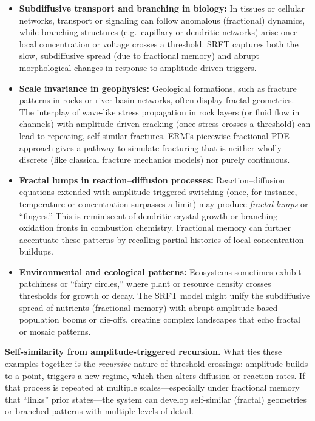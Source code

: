 \documentclass[12pt]{article}
\begin{document}
\begin{itemize}
    \item \textbf{Subdiffusive transport and branching in biology:}
    In tissues or cellular networks, transport or signaling can follow
    anomalous (fractional) dynamics, while branching structures (e.g.\ capillary
    or dendritic networks) arise once local concentration or voltage crosses
    a threshold. SRFT captures both the slow, subdiffusive spread (due to
    fractional memory) and abrupt morphological changes in response to 
    amplitude-driven triggers.

    \item \textbf{Scale invariance in geophysics:}
    Geological formations, such as fracture patterns in rocks or river basin
    networks, often display fractal geometries. The interplay of wave-like
    stress propagation in rock layers (or fluid flow in channels) with
    amplitude-driven cracking (once stress crosses a threshold) can lead to
    repeating, self-similar fractures. ERM’s piecewise fractional PDE approach
    gives a pathway to simulate fracturing that is neither wholly discrete
    (like classical fracture mechanics models) nor purely continuous.

    \item \textbf{Fractal lumps in reaction–diffusion processes:}
    Reaction–diffusion equations extended with amplitude-triggered switching
    (once, for instance, temperature or concentration surpasses a limit)
    may produce \emph{fractal lumps} or “fingers.” This is reminiscent of 
    dendritic crystal growth or branching oxidation fronts in combustion
    chemistry. Fractional memory can further accentuate these patterns by
    recalling partial histories of local concentration buildups.

    \item \textbf{Environmental and ecological patterns:}
    Ecosystems sometimes exhibit patchiness or “fairy circles,” where plant
    or resource density crosses thresholds for growth or decay. The SRFT model
    might unify the subdiffusive spread of nutrients (fractional memory) with
    abrupt amplitude-based population booms or die-offs, creating complex
    landscapes that echo fractal or mosaic patterns.
\end{itemize}

\medskip

\noindent
\textbf{Self-similarity from amplitude-triggered recursion.}
What ties these examples together is the \emph{recursive} nature of threshold
crossings: amplitude builds to a point, triggers a new regime, which then
alters diffusion or reaction rates. If that process is repeated at multiple
scales—especially under fractional memory that “links” prior states—the
system can develop self-similar (fractal) geometries or branched patterns
with multiple levels of detail.
\end{document}
